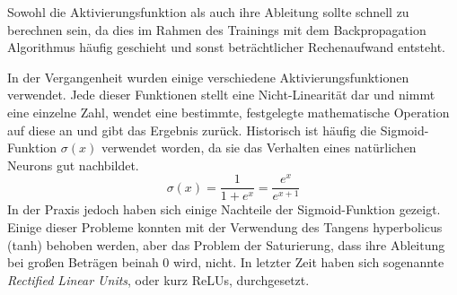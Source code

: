 Sowohl die Aktivierungsfunktion als auch ihre Ableitung sollte schnell zu berechnen sein, 
da dies im Rahmen des Trainings mit dem Backpropagation Algorithmus häufig geschieht 
und sonst beträchtlicher Rechenaufwand entsteht.

In der Vergangenheit wurden einige verschiedene Aktivierungsfunktionen verwendet.
Jede dieser Funktionen stellt eine Nicht-Linearität dar und nimmt eine einzelne Zahl, wendet eine bestimmte, festgelegte mathematische 
Operation auf diese an und gibt das Ergebnis zurück.
Historisch ist häufig die Sigmoid-Funktion \(\sigma(x)\) verwendet worden, da sie das Verhalten eines natürlichen Neurons gut nachbildet.
\begin{equation}
	\sigma(x) = \frac{1}{1 + e^x} = \frac{e^x}{e^{x + 1}}
	\label{func:Sigmoid}
\end{equation}
In der Praxis jedoch haben sich einige Nachteile der Sigmoid-Funktion gezeigt.
Einige dieser Probleme konnten mit der Verwendung des Tangens hyperbolicus (tanh) behoben werden, 
aber das Problem der Saturierung, dass ihre Ableitung bei großen Beträgen beinah \(0\) wird, nicht.
In letzter Zeit haben sich sogenannte \textit{Rectified Linear Units}, oder kurz ReLUs, durchgesetzt.

	
	
